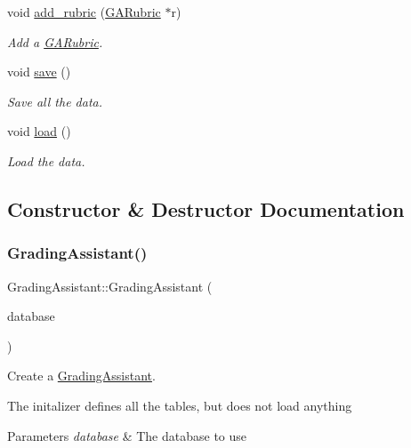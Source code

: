 \begin{DoxyCompactItemize}
void \hyperlink{class_grading_assistant_ad072b785eb9fc6b174e0129f4cf3697a}{add\+\_\+rubric} (\hyperlink{class_g_a_rubric}{G\+A\+Rubric} $\ast$r)
\begin{DoxyCompactList}\small\item\em Add a \hyperlink{class_g_a_rubric}{G\+A\+Rubric}. \end{DoxyCompactList}\item 
void \hyperlink{class_grading_assistant_ae4d29640f6444cc59d7df5eb73f60115}{save} ()
\begin{DoxyCompactList}\small\item\em Save all the data. \end{DoxyCompactList}\item 
void \hyperlink{class_grading_assistant_a2430309557f1fd413a75165b4c7c9a3a}{load} ()
\begin{DoxyCompactList}\small\item\em Load the data. \end{DoxyCompactList}\end{DoxyCompactItemize}


\subsection{Constructor \& Destructor Documentation}
\mbox{\label{class_grading_assistant_af3831409f51b90db892b366527742f01}} 
\subsubsection{\texorpdfstring{Grading\+Assistant()}{GradingAssistant()}}
{\footnotesize\ttfamily Grading\+Assistant\+::\+Grading\+Assistant (\begin{DoxyParamCaption}\item[{\hyperlink{class_database_manager}{Database\+Manager} $\ast$}]{database }\end{DoxyParamCaption})}



Create a \hyperlink{class_grading_assistant}{Grading\+Assistant}. 

The initalizer defines all the tables, but does not load anything


\begin{DoxyParams}{Parameters}
{\em database} & The database to use \\
\hline
\end{DoxyParams}
\mbox{\label{class_grading_assistant_a8bc628e497b2f818fdc97c2e8eb5e26f}} 
